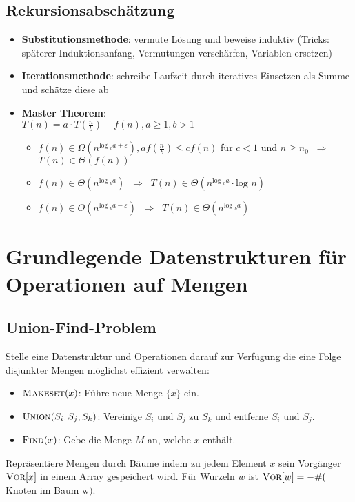 \documentclass[a4paper,10pt]{scrartcl}
\newcommand{\tbf}{\textbf}
\newcommand{\tsc}{\textsc}
\newcommand{\Ra}{\Rightarrow}
\begin{document}
\subsection{Rekursionsabschätzung}
\begin{itemize}
 \item \tbf{Substitutionsmethode}: vermute Lösung und beweise induktiv (Tricks: späterer Induktionsanfang, Vermutungen verschärfen, Variablen ersetzen)
 \item \tbf{Iterationsmethode}: schreibe Laufzeit durch iteratives Einsetzen als Summe und schätze diese ab
 \item \tbf{Master Theorem}: \\
	$T(n) = a \cdot T(\frac{n}{b}) + f(n), a \geq 1, b > 1$
	\begin{itemize}
	 \item $f(n) \in \Omega(n^{\text{log }_b a+\varepsilon}), a f(\frac{n}{b}) \leq c f(n)$ für $c < 1$ und $n \geq n_0$ $\ \Ra \ $ $T(n) \in \Theta(f(n))$
	\item $f(n) \in \Theta(n^{\text{log }_b a})$ $\ \Ra \ $ $T(n) \in \Theta(n^{\text{log }_b a} \cdot \text{log } n)$
	\item $f(n) \in O(n^{\text{log }_b a-\varepsilon})$ $\ \Ra \ $ $T(n) \in \Theta(n^{\text{log }_b a})$
	\end{itemize}
\end{itemize}


\newpage
\section{Grundlegende Datenstrukturen für Operationen auf Mengen}
\subsection{Union-Find-Problem}
Stelle eine Datenstruktur und Operationen darauf zur Verfügung die eine Folge disjunkter Mengen möglichst effizient verwalten:
\begin{itemize}
 \item $\tsc{Makeset}(x)$: Führe neue Menge $\{x\}$ ein.
 \item $\tsc{Union}(S_i,S_j,S_k)$: Vereinige $S_i$ und $S_j$ zu $S_k$ und entferne $S_i$ und $S_j$.
 \item $\tsc{Find}(x)$: Gebe die Menge $M$ an, welche $x$ enthält.
\end{itemize}

Repräsentiere Mengen durch Bäume indem zu jedem Element $x$ sein Vorgänger $\tsc{Vor}[x]$ in einem Array gespeichert wird. Für Wurzeln $w$ ist $\tsc{Vor}[w] = - \# ($Knoten im Baum w$)$.
\end{document}
